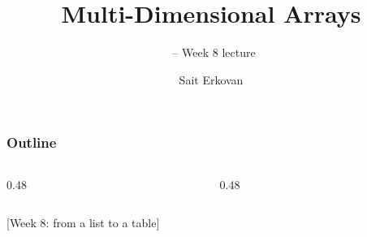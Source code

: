 \documentclass[aspectratio=169,10pt,compress]{beamer}
\title[Arrays ND: Lecture]{
	Multi-Dimensional Arrays
}
\subtitle{
	\cisOOO\ -- Week 8 lecture
}
\author[Erkovan]{Sait Erkovan}
\institute[FCIS]{
	Faculty of Computer and Information Sciences\\
	Yeditepe University
}
\date{{\tiny \hbTimeStamp}}
\begin{document}
\begin{frame}[t,fragile]
	\titlepage
\end{frame}




\begin{frame}[t,fragile] \frametitle{Outline}
	\begin{columns}[T]
		\begin{column}{0.48\textwidth}
			\tableofcontents[sections={1-3}, hideallsubsections]
		\end{column}
		\begin{column}{0.48\textwidth}
			\tableofcontents[sections={4-6}, hideallsubsections]
		\end{column}
	\end{columns}
\end{frame}




[\small Week 8: from a list to a table]
\end{document}

